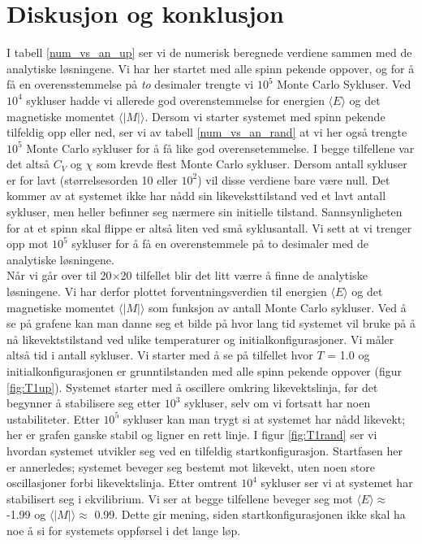 \documentclass[11pt,a4paper]{article}
\begin{document}
\section{Diskusjon og konklusjon}
I tabell  \ref{num_vs_an_up} ser vi de numerisk beregnede verdiene sammen med de analytiske løsningene. Vi har her startet med alle spinn pekende oppover, og for å få en overensstemmelse på \textit{to} desimaler trengte vi $10^5$ Monte Carlo Sykluser. Ved $10^4$ sykluser hadde vi allerede god overenstemmelse for energien $\langle E \rangle$ og det magnetiske momentet $\langle |M| \rangle$. Dersom vi starter systemet med spinn pekende tilfeldig opp eller ned, ser vi av tabell \ref{num_vs_an_rand} at vi her også trengte $10^5$  Monte Carlo sykluser for å få like god overensetemmelse. I begge tilfellene var det altså $C_V$ og $\chi$ som krevde flest Monte Carlo sykluser. Dersom antall sykluser er for lavt (størrelsesorden 10 eller $10^2$) vil disse verdiene bare være null. Det kommer av at systemet ikke har nådd sin likeveksttilstand ved et lavt antall sykluser, men heller befinner seg nærmere sin initielle tilstand. Sannsynligheten for at et spinn skal flippe er altså liten ved små syklusantall. Vi sett at vi trenger opp mot $10^5$ sykluser for å få en overenstemmele på to desimaler med de analytiske løsningene. \\

Når vi går over til 20$\times$20 tilfellet blir det litt værre å finne de analytiske løsningene. Vi har derfor plottet forventningsverdien til energien $\langle E \rangle$  og det magnetiske momentet $\langle |M| \rangle$ som funksjon av antall Monte Carlo sykluser. Ved å se på grafene kan man danne seg et bilde på hvor lang tid systemet vil bruke på å nå likevektstilstand ved ulike temperaturer og initialkonfigurasjoner. Vi måler altså tid i antall sykluser. Vi starter med å se på  tilfellet hvor $T$ = 1.0 og initialkonfigurasjonen er grunntilstanden med alle spinn pekende oppover (figur \ref{fig:T1up}). Systemet starter med å oscillere omkring likevektslinja, før det begynner å stabilisere seg etter $10^3$ sykluser, selv om vi fortsatt har noen ustabiliteter. Etter $10^5$ sykluser kan man trygt si at systemet har nådd likevekt; her er grafen ganske stabil og ligner en rett linje. I figur \ref{fig:T1rand} ser vi hvordan systemet utvikler seg ved en tilfeldig startkonfigurasjon. Startfasen her er annerledes; systemet beveger seg bestemt mot likevekt, uten noen store oscillasjoner forbi likevektslinja. Etter omtrent $10^4$ sykluser ser vi at systemet har stabilisert seg i ekvilibrium. Vi ser at begge tilfellene beveger seg mot $\langle E \rangle \approx$ -1.99 og $\langle |M| \rangle \approx $ 0.99. Dette gir mening, siden startkonfigurasjonen ikke skal ha noe å si for systemets oppførsel i det lange løp.
\end{document}
